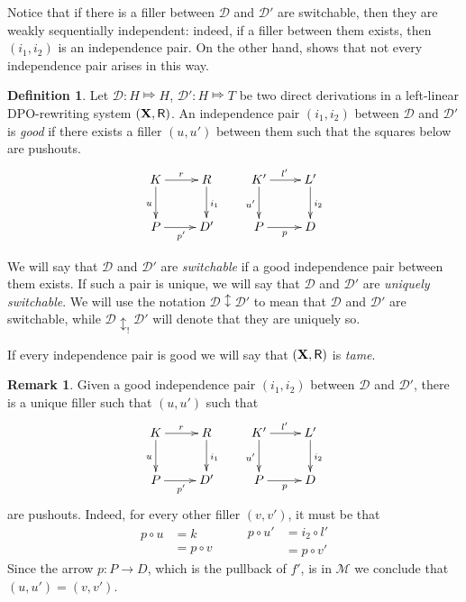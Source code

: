 \documentclass[a4paper]{article}
\def\R{\mathsf{R}}
\def\X{\textbf {\textup{X}}}
\renewcommand{\P}{\textbf {\textup{P}}}
\newcommand{\dder}[1]{\mathscr{#1}}
\theoremstyle{definition}
\newtheorem{definition}[theorem]{Definition}
\newtheorem{remark}[theorem]{Remark}
\begin{document}
Notice that if there is a filler between  $\dder{D}$ and $\dder{D}'$ are switchable, then they are weakly sequentially independent: indeed, if a filler between them exists, then $(i_1, i_2)$ is an independence pair. On the other hand,  shows that not every independence pair arises in this way.

\begin{definition} Let  $\dder{D}\colon H\Mapsto H$, $\dder{D}'\colon H\Mapsto T$ be two direct derivations in a left-linear DPO-rewriting system  $(\X, \R)$. An independence pair $(i_1, i_2)$ between $\dder{D}$ and $\dder{D}'$ is \emph{good} if there exists a filler $(u,u')$ between them such that  the squares below are pushouts.\[\xymatrix{K \ar[r]^{r} \ar[d]_{u}& R \ar[d]^{i_1} &K' \ar[r]^{l'} \ar[d]_{u'}& L'\ar[d]^{i_2} \\P \ar[r]_{p'}& D' & P \ar[r]_{p} & D}\]
	
We will say that $\dder{D}$ and $\dder{D}'$ are \emph{switchable} if a good independence pair between them exists. If such a pair is unique, we will say that $\dder{D}$ and $\dder{D}'$ are \emph{uniquely switchable}. We will use the notation $\dder{D}\updownarrow \dder{D'}$ to mean that $\dder{D}$ and $\dder{D}'$ are switchable, while $\dder{D}\updownarrow_! \dder{D'}$ will denote that they are uniquely so.


If every independence pair is good we will say that $(\X, \R)$ is \emph{tame}.
\end{definition}

\begin{remark}\label{rem:unic} Given a good independence pair $(i_1, i_2)$ between $\dder{D}$ and $\dder{D}'$, there is a unique filler  such that $(u,u')$ such that 
	\[\xymatrix{K \ar[r]^{r} \ar[d]_{u}& R \ar[d]^{i_1} &K' \ar[r]^{l'} \ar[d]_{u'}& L'\ar[d]^{i_2} \\P \ar[r]_{p'}& D' & P \ar[r]_{p} & D}\]
	are pushouts. Indeed, for every other filler $(v,v')$, it must be that
	\[\begin{split}
		p\circ u &=k \\&= p\circ v
	\end{split}\qquad \begin{split}
	p\circ u' &= i_2\circ l' \\&= p\circ v'
	\end{split}\]
	Since the arrow $p\colon P\to D$, which is the pullback of $f'$, is in $\mathcal{M}$ we conclude that $(u,u')=(v,v')$.
\end{remark}
\end{document}
